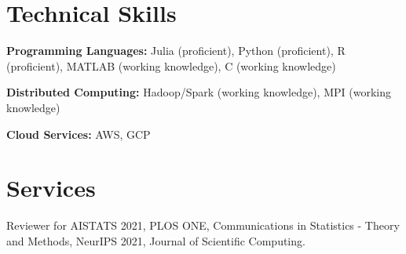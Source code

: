 \documentclass[11pt,hidelinks]{article}
\begin{document}

\section*{Technical Skills}

\hspace{-.25em}\begin{itemize*}[itemjoin={{ $\bullet$}}, label={}]
\item \textbf{Programming Languages:} Julia (proficient), Python (proficient), R (proficient), MATLAB (working knowledge), C (working knowledge)
\item \textbf{Distributed Computing:} Hadoop/Spark (working knowledge), MPI (working knowledge)
\item \textbf{Cloud Services:} AWS, GCP
\end{itemize*}




\section*{Services}

\hspace{-.25em}\begin{itemize*}[itemjoin={{ $\bullet$}}, label={}]
\item Reviewer for AISTATS 2021, PLOS ONE, Communications in Statistics - Theory and Methods, NeurIPS 2021, Journal of Scientific Computing.
\end{itemize*}

\end{document}
